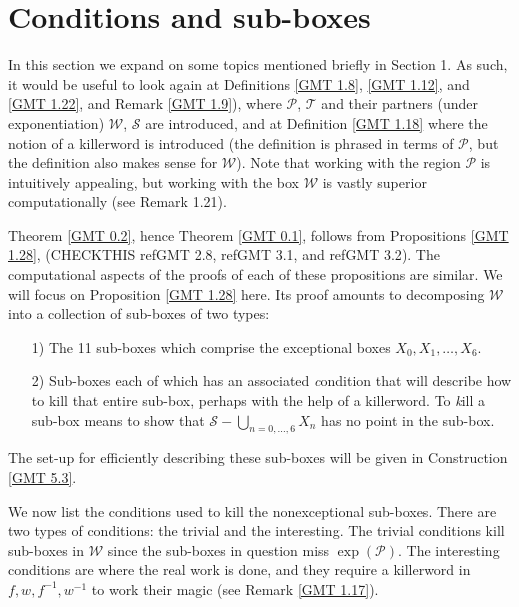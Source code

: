  
\chapter{Conditions and sub-boxes}
  
In this section we expand on some topics mentioned briefly in Section 1.  As such, it would be useful to look again at
Definitions \ref{GMT 1.8}, \ref{GMT 1.12}, and \ref{GMT 1.22}, and Remark \ref{GMT 1.9}),
where ${\mathcal P}$, ${\mathcal T}$ and their partners (under exponentiation)
${\mathcal W}$, ${\mathcal S}$ are introduced, and at
Definition \ref{GMT 1.18}
 where the notion of a killerword is introduced (the
definition is phrased in terms of ${\mathcal P}$, but the definition also makes sense for ${\mathcal W}$).  Note that working with
the region
${\mathcal P}$ is intuitively appealing, but working with the box ${\mathcal W}$ is vastly superior computationally (see Remark
1.21).

Theorem \ref{GMT 0.2},
hence
Theorem \ref{GMT 0.1}, follows from
Propositions \ref{GMT 1.28},
	(CHECKTHIS ref{GMT 2.8}, ref{GMT 3.1}, and ref{GMT 3.2}).  %
  The computational aspects of the proofs of each of these propositions are similar.  We will focus on
Proposition \ref{GMT 1.28}
 here.
Its proof   amounts to decomposing 
 ${\mathcal W}$ into a collection of sub-boxes of two types:
\begin{itemize}
\item[1)]   The 11 sub-boxes which comprise the 
exceptional boxes $X_0, X_1, \ldots, X_6.$ 

\item[2)]   Sub-boxes each of which has an associated {\textit condition} that will describe how to kill that entire sub-box,
perhaps with the help of a killerword.  To {\textit kill} a sub-box means to show that 
${\mathcal S} - \bigcup_{n = 0,\dots, 6} X_n$ has no point in the sub-box. 
\end{itemize}
\noindent The set-up for efficiently describing these sub-boxes will be given in Construction \ref{GMT 5.3}. 
 

We now list the conditions used to kill the nonexceptional sub-boxes.  There are two types of conditions: the trivial and
the interesting.  The trivial conditions kill sub-boxes in ${\mathcal W}$ since the sub-boxes in question miss 
$\exp({\mathcal P}).$  The interesting conditions are where the real work is done, and they require a killerword in $f, w,
f^{-1}, w^{-1}$ to work their magic (see
Remark \ref{GMT 1.17}).

